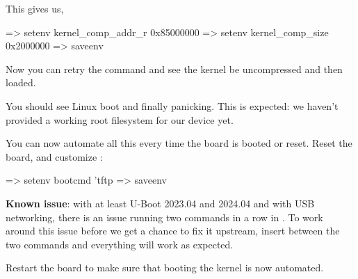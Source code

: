 This gives us,

\begin{ubootinput}
=> setenv kernel_comp_addr_r 0x85000000
=> setenv kernel_comp_size 0x2000000
=> saveenv
\end{ubootinput}

Now you can retry the  command and see the kernel be uncompressed
and then loaded.
\fi

You should see Linux boot and finally panicking. This is expected: we
haven't provided a working root filesystem for our device yet.

You can now automate all this every time the board is booted or
reset. Reset the board, and customize :

\begin{ubootinput}
=> setenv bootcmd 'tftp %
=> saveenv
\end{ubootinput}

{{\bf Known issue}: with at least U-Boot 2023.04 and 2024.04 and with
USB networking, there is an issue running two  commands in a
row in . To work around this issue before we get a chance
to fix it upstream, insert  between the two 
commands and everything will work as expected.}{}

Restart the board to make sure that booting the kernel is now automated.

